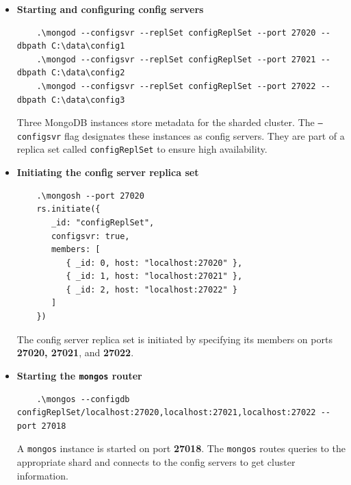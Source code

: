 \documentclass[a4paper,12pt]{article}
\begin{document}
\begin{itemize}
\begin{lstlisting}
    .\mongosh --port 27002
    rs.initiate()

    .\mongosh --port 27003
    rs.initiate()
    \end{lstlisting}

          Each shard is configured as a replica set, ensuring that data is copied for safety and high availability.

    \item \textbf{Starting and configuring config servers}

          \begin{lstlisting}
    .\mongod --configsvr --replSet configReplSet --port 27020 --dbpath C:\data\config1 
    .\mongod --configsvr --replSet configReplSet --port 27021 --dbpath C:\data\config2
    .\mongod --configsvr --replSet configReplSet --port 27022 --dbpath C:\data\config3
    \end{lstlisting}

          Three MongoDB instances store metadata for the sharded cluster. The \texttt{--configsvr} flag designates these instances as config servers. They are part of a replica set called \texttt{configReplSet} to ensure high availability.

    \item \textbf{Initiating the config server replica set}

          \begin{lstlisting}
    .\mongosh --port 27020
    rs.initiate({
       _id: "configReplSet",
       configsvr: true,
       members: [
          { _id: 0, host: "localhost:27020" },
          { _id: 1, host: "localhost:27021" },
          { _id: 2, host: "localhost:27022" }
       ]
    })
    \end{lstlisting}

          The config server replica set is initiated by specifying its members on ports \textbf{27020, 27021}, and \textbf{27022}.

    \item \textbf{Starting the \texttt{mongos} router}

          \begin{lstlisting}
    .\mongos --configdb configReplSet/localhost:27020,localhost:27021,localhost:27022 --port 27018
    \end{lstlisting}

          A \texttt{mongos} instance is started on port \textbf{27018}. The \texttt{mongos} routes queries to the appropriate shard and connects to the config servers to get cluster information.


\end{itemize}
\end{document}
